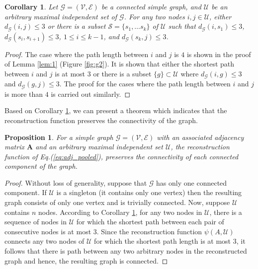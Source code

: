 \documentclass{article}
\newtheorem{prop}{Proposition}
\newtheorem{corollary}{Corollary}
\begin{document}
\begin{corollary}\label{cor:1}
	Let $\mathcal{G} = (\mathcal{V}, \mathcal{E})$ be a connected simple graph, and $\mathcal{U}$ be an arbitrary maximal independent set of $\mathcal{G}$. For any two nodes $i, j \in \mathcal{U}$, either $d_\mathcal{G}(i, j) \leq 3$ or there is a subset $\mathcal{S} = \{s_1, \dots s_k\}$ of $\mathcal{U}$ such that $d_\mathcal{G}(i, s_1) \leq 3$, $d_\mathcal{G}(s_i, s_{i+1}) \leq 3$, $1 \leq i \leq k-1$, and $d_\mathcal{G}(s_k, j) \leq 3$.\bigskip
\end{corollary}

\begin{proof}
	The case where the path length between $i$ and $j$ is $4$ is shown in the proof of Lemma \ref{lem:1} (Figure \ref{fig:g2}). It is shown that either the shortest path between $i$ and $j$ is at most $3$ or there is a subset $\{g\} \subset \mathcal{U}$ where $d_\mathcal{G}(i, g) \leq 3$ and $d_\mathcal{G}(g, j) \leq 3$. The proof for the cases where the path length between $i$ and $j$ is more than $4$ is carried out similarly.
\end{proof}

Based on Corollary \ref{cor:1}, we can present a theorem which indicates that the reconstruction function preserves the connectivity of the graph.

\begin{prop}
	For a simple graph $\mathcal{G} = (\mathcal{V}, \mathcal{E})$ with an associated adjacency matrix $\mathbf{A}$ and an arbitrary maximal independent set $\mathcal{U}$, the reconstruction function of Eq.(\ref{eq:adj_pooled}), preserves the connectivity of each connected component of the graph.
\end{prop}

\begin{proof}
	Without loss of generality, suppose that $\mathcal{G}$ has only one connected component. If $\mathcal{U}$ is a singleton (it contains only one vertex) then the resulting graph consists of only one vertex and is trivially connected. Now, suppose $\mathcal{U}$ contains $n$ nodes. According to Corollary \ref{cor:1}, for any two nodes in $\mathcal{U}$, there is a sequence of nodes in $\mathcal{U}$ for which the shortest path between each pair of consecutive nodes is at most $3$. Since the reconstruction function $\psi(A, \mathcal{U})$ connects any two nodes of $\mathcal{U}$ for which the shortest path length is at most $3$, it follows that there is path between any two arbitrary nodes in the reconstructed graph and hence, the resulting graph is connected.
\end{proof}
\end{document}
